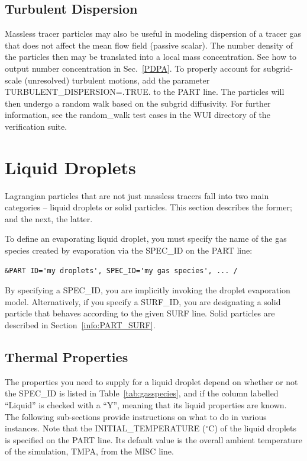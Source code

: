 \documentclass[11pt]{book}
\begin{document}
\subsection*{Turbulent Dispersion}

Massless tracer particles may also be useful in modeling dispersion of a tracer gas that does not affect the mean flow field (passive scalar).  The number density of the particles then may be translated into a local mass concentration.  See how to output number concentration in Sec.~\ref{PDPA}.  To properly account for subgrid-scale (unresolved) turbulent motions, add the parameter {\ct TURBULENT\_DISPERSION=.TRUE.} to the {\ct PART} line.  The particles will then undergo a random walk based on the subgrid diffusivity.  For further information, see the {\ct random\_walk} test cases in the {\ct WUI} directory of the verification suite.


\section{Liquid Droplets}

Lagrangian particles that are not just massless tracers fall into two main categories -- liquid droplets or solid particles. This section describes the former; and the next, the latter.

To define an evaporating liquid droplet, you must specify the name of the gas species created by evaporation via the {\ct SPEC\_ID} on the {\ct PART} line:
\begin{lstlisting}
&PART ID='my droplets', SPEC_ID='my gas species', ... /
\end{lstlisting}
By specifying a {\ct SPEC\_ID}, you are implicitly invoking the droplet evaporation model. Alternatively, if you specify a {\ct SURF\_ID}, you are designating a solid particle that behaves according to the given {\ct SURF} line. Solid particles are described in Section~\ref{info:PART_SURF}.


\subsection{Thermal Properties}
\label{thermal_part_props}

The properties you need to supply for a liquid droplet depend on whether or not the {\ct SPEC\_ID} is listed in Table~\ref{tab:gasspecies}, and if the column labelled ``Liquid'' is checked with a ``Y'', meaning that its liquid properties are known. The following sub-sections provide instructions on what to do in various instances. Note that the {\ct INITIAL\_TEMPERATURE} ($^\circ$C) of the liquid droplets is specified on the {\ct PART} line. Its default value is the overall ambient temperature of the simulation, {\ct TMPA}, from the {\ct MISC} line.
\end{document}
